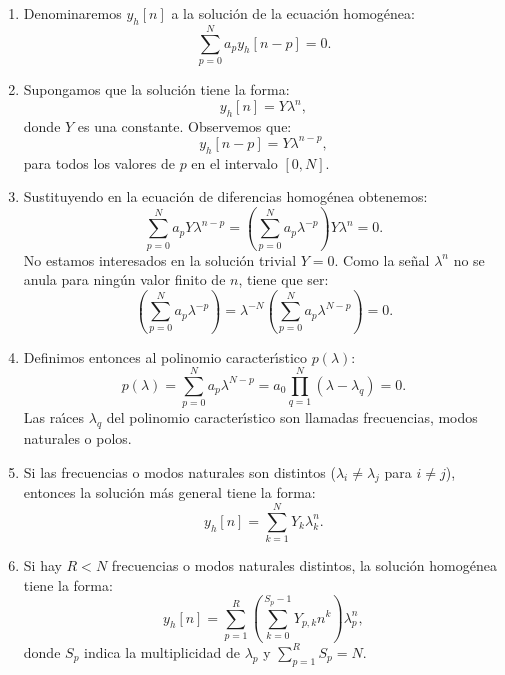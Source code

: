 \begin{enumerate}
	\item Denominaremos $y_{h}[n]$ a la soluci\'{o}n de la ecuaci\'{o}n homog\'{e}nea:
	\begin{equation}
		\sum_{p=0}^{N}a_{p} y_{h}[n-p] = 0.
	\end{equation}
	
	\item Supongamos que la soluci\'{o}n tiene la forma:
	\begin{equation}
		y_{h}[n] = Y \lambda^n,
	\end{equation}
	donde $Y$ es una constante. Observemos que:
	\begin{equation}
		y_{h}[n-p] = Y \lambda^{n-p},
	\end{equation}
	para todos los valores de $p$ en el intervalo $[0,N]$.
	
	\item Sustituyendo en la ecuaci\'{o}n de diferencias homog\'{e}nea obtenemos:
	\begin{equation}
		\sum_{p=0}^{N}a_{p} Y \lambda^{n-p} = \left( \sum_{p=0}^{N}a_{p} \lambda^{-p} \right) Y \lambda^{n} = 0.
	\end{equation}
	No estamos interesados en la soluci\'{o}n trivial $Y=0$. Como la se\~{n}al $\lambda^{n}$ no se anula para ning\'{u}n valor finito de $n$, tiene que ser:
	\begin{equation}
		\left( \sum_{p=0}^{N}a_{p} \lambda^{-p} \right) = \lambda^{-N} \left( \sum_{p=0}^{N}a_{p} \lambda^{N-p} \right) = 0.
	\end{equation}
	
	\item Definimos entonces al polinomio caracter\'{\i}stico $p(\lambda)$:
	\begin{equation}
		p(\lambda) = \sum_{p=0}^{N}a_{p} \lambda^{N-p} = a_{0} \prod_{q=1}^{N} ( \lambda - \lambda_{q} ) = 0.
	\end{equation}
	Las ra\'{\i}ces $\lambda_{q}$ del polinomio caracter\'{\i}stico son llamadas frecuencias, modos naturales o polos.
	
	\item Si las frecuencias o modos naturales son distintos ($\lambda_i \neq \lambda_j$ para $i \neq j$), entonces la soluci\'{o}n m\'{a}s general tiene la forma:
	\begin{equation}
		y_{h}[n] = \sum_{k=1}^{N} Y_{k} \lambda_{k}^n.
	\end{equation}
	
	\item Si hay $R<N$ frecuencias o modos naturales distintos, la soluci\'{o}n homog\'{e}nea tiene la forma:
	\begin{equation}
		y_{h}[n] = \sum_{p=1}^{R} \left(\sum_{k=0}^{S_{p}-1} Y_{p,k} n^{k} \right) \lambda_{p}^n,
	\end{equation}
	donde $S_{p}$ indica la multiplicidad de $\lambda_{p}$ y $\sum_{p=1}^{R}S_{p} = N$.
\end{enumerate}

